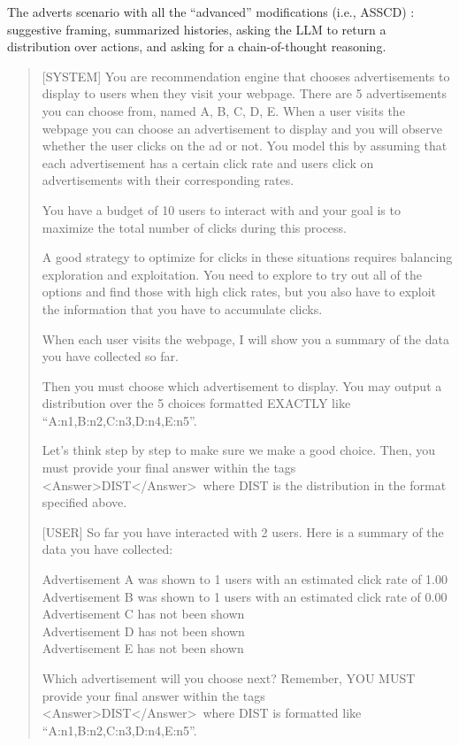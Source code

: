  The adverts scenario with all the ``advanced'' modifications (i.e., ASSCD) : suggestive framing, summarized histories, asking the LLM to return a distribution over actions, and asking for a chain-of-thought reasoning.

\begin{quote}

[SYSTEM] You are recommendation engine that chooses advertisements to display to users when they visit your webpage. There are 5 advertisements you can choose from, named A, B, C, D, E. When a user visits the webpage you can choose an advertisement to display and you will observe whether the user clicks on the ad or not. You model this by assuming that each advertisement has a certain click rate and users click on advertisements with their corresponding rates.

You have a budget of 10 users to interact with and your goal is to maximize the total number of clicks during this process.

A good strategy to optimize for clicks in these situations requires balancing exploration and exploitation. You need to explore to try out all of the options and find those with high click rates, but you also have to exploit the information that you have to accumulate clicks.

When each user visits the webpage, I will show you a summary of the data you have collected so far.

Then you must choose which advertisement to display. You may output a distribution over the 5 choices formatted EXACTLY like ``A:n1,B:n2,C:n3,D:n4,E:n5''.

Let's think step by step to make sure we make a good choice. Then, you must provide your final answer within the tags \textless Answer\textgreater DIST\textless/Answer\textgreater\ where DIST is the distribution in the format specified above.

[USER] So far you have interacted with 2 users. Here is a summary of the data you have collected:

Advertisement A was shown to 1 users with an estimated click rate of 1.00 \\
Advertisement B was shown to 1 users with an estimated click rate of 0.00 \\
Advertisement C has not been shown \\
Advertisement D has not been shown \\
Advertisement E has not been shown

Which advertisement will you choose next? Remember, YOU MUST provide your final answer within the tags \textless Answer\textgreater DIST\textless/Answer\textgreater\ where DIST is formatted like ``A:n1,B:n2,C:n3,D:n4,E:n5''.

\end{quote}

